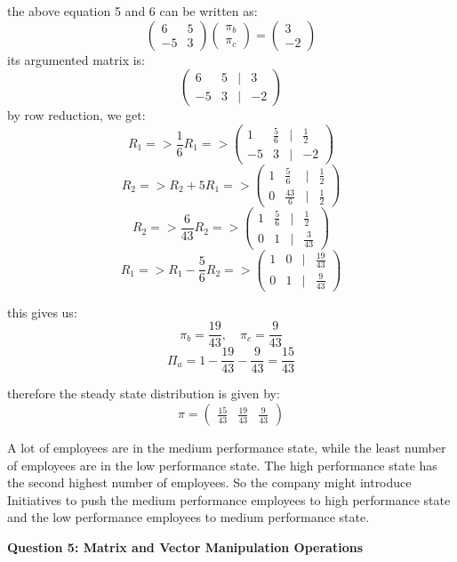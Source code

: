 \documentclass{article}
\begin{document}
the above equation 5 and 6 can be written as:
\[\begin{pmatrix}6&5\\-5&3\end{pmatrix}\begin{pmatrix}\pi_b\\\pi_c\end{pmatrix} = \begin{pmatrix}3\\-2\end{pmatrix}\]
its argumented matrix is:
\[\begin{pmatrix}6&5&|&3\\-5&3&|&-2\end{pmatrix}\]
by row reduction, we get:
\[R_1 => \frac{1}{6}R_1 => \begin{pmatrix}1&\frac{5}{6}&|&\frac{1}{2}\\-5&3&|&-2\end{pmatrix}\]
\[R_2 => R_2 + 5R_1 => \begin{pmatrix}1&\frac{5}{6}&|&\frac{1}{2}\\0&\frac{43}{6}&|&\frac{1}{2}\end{pmatrix}\]
\[R_2 => \frac{6}{43}R_2 => \begin{pmatrix}1&\frac{5}{6}&|&\frac{1}{2}\\0&1&|&\frac{3}{43}\end{pmatrix}\]
\[R_1 => R_1 - \frac{5}{6}R_2 => \begin{pmatrix}1&0&|&\frac{19}{43}\\0&1&|&\frac{9}{43}\end{pmatrix}\]

this gives us:
\[\pi_b = \frac{19}{43}, \quad \pi_c = \frac{9}{43}\]
\[\Pi_a = 1 - \frac{19}{43} - \frac{9}{43} = \frac{15}{43}\]

therefore the steady state distribution is given by:
\[\pi = \begin{pmatrix}\frac{15}{43}&\frac{19}{43}&\frac{9}{43}\end{pmatrix}\]


A lot of employees are in the medium performance state, while the least number of employees are in the low performance state. The high performance state has the second highest number of employees. So the company might introduce Initiatives to push the medium performance employees to high performance state and the low performance employees to medium performance state.

\begin{center}
    \large \textbf{Question 5: Matrix and Vector Manipulation Operations}
\end{center}
\end{document}
